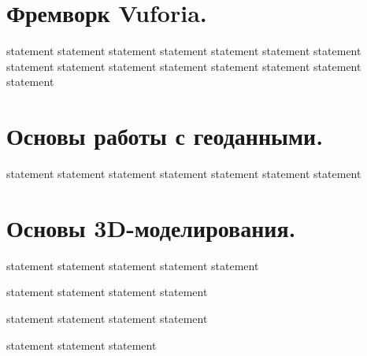 \section{Фремворк Vuforia.}

{statement}
{statement}
{statement}
{statement}
{statement}
{statement}
{statement}
{statement}
{statement}
{statement}
{statement}
{statement}
{statement}
{statement}
{statement}

\section{Основы работы с геоданными.}

{statement}
{statement}
{statement}
{statement}
{statement}
{statement}
{statement}

\section{Основы 3D-моделирования.}

{statement}
{statement}
{statement}
{statement}
{statement}

{statement}
{statement}
{statement}
{statement}

{statement}
{statement}
{statement}
{statement}

{statement}
{statement}
{statement}

